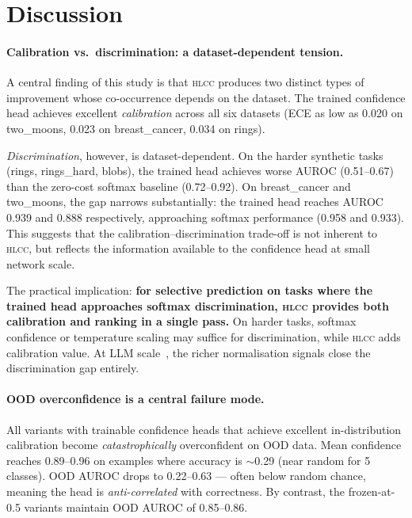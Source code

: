 \documentclass[11pt,a4paper]{article}
\newcommand{\hlcc}{\textsc{hlcc}}
\begin{document}
\section{Discussion}
\label{sec:discussion}

\paragraph{Calibration vs.\ discrimination: a dataset-dependent tension.}
A central finding of this study is that \hlcc{} produces two
distinct types of improvement whose co-occurrence depends on the
dataset.  The trained confidence head achieves excellent
\emph{calibration} across all six datasets (ECE as low as 0.020 on
two\_moons, 0.023 on breast\_cancer, 0.034 on rings).

\emph{Discrimination}, however, is dataset-dependent.  On the harder
synthetic tasks (rings, rings\_hard, blobs), the trained head achieves
worse AUROC (0.51--0.67) than the zero-cost softmax baseline
(0.72--0.92).  On breast\_cancer and two\_moons, the gap narrows
substantially: the trained head reaches AUROC 0.939 and 0.888
respectively, approaching softmax performance (0.958 and 0.933).
This suggests that the calibration--discrimination trade-off is not
inherent to \hlcc{}, but reflects the information available to the
confidence head at small network scale.

The practical implication: \textbf{for selective prediction on tasks
where the trained head approaches softmax discrimination,
\hlcc{} provides both calibration and ranking in a single pass.}
On harder tasks, softmax confidence or temperature scaling may
suffice for discrimination, while \hlcc{} adds calibration value.
At LLM scale~\cite{mccallum2026hlcc}, the richer normalisation
signals close the discrimination gap entirely.

\paragraph{OOD overconfidence is a central failure mode.}
All variants with trainable confidence heads that achieve excellent
in-distribution calibration become \emph{catastrophically}
overconfident on OOD data.  Mean confidence reaches 0.89--0.96 on
examples where accuracy is $\sim$0.29 (near random for 5 classes).
OOD AUROC drops to 0.22--0.63 --- often below random chance, meaning
the head is \emph{anti-correlated} with correctness.  By contrast,
the frozen-at-0.5 variants maintain OOD AUROC of 0.85--0.86.
\end{document}
